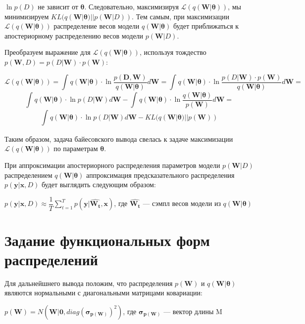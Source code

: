 \documentclass{article}
\begin{document}
$\ln{p(D)}$ не зависит от $\pmb{\theta}$. Следовательно, максимизируя $\mathcal{L}(q(\mathbf{W} | \pmb{\theta}))$, мы минимизируем $KL(q(\mathbf{W} | \pmb{\theta}) || p(\mathbf{W}| D))$. Тем самым, при максимизации $\mathcal{L}(q(\mathbf{W} | \pmb{\theta}))$ распределение весов модели $q(\mathbf{W} | \pmb{\theta})$ будет приближаться к апостериорному распределению весов модели $p(\mathbf{W}| D)$.

Преобразуем выражение для $\mathcal{L}(q(\mathbf{W} | \pmb{\theta}))$, используя тождество
$p(\mathbf{W}, D) = p(D | \mathbf{W}) \cdot p(\mathbf{W})$:

\[
\mathcal{L}(q(\mathbf{W} | \pmb{\theta})) =
\int_{}{} q(\mathbf{W} | \pmb{\theta}) \cdot \ln{\dfrac{p(\mathbf{D}, \mathbf{W})}{q(\mathbf{W} | \pmb{\theta})}} d\mathbf{W} =
\int_{}{} q(\mathbf{W} | \pmb{\theta}) \cdot \ln{\dfrac{p(D | \mathbf{W}) \cdot p(\mathbf{W})}{q(\mathbf{W} | \pmb{\theta})}} d\mathbf{W} =
\]\[
\int_{}{} q(\mathbf{W} | \pmb{\theta}) \cdot \ln{p(D | \mathbf{W})} d\mathbf{W} - \int_{}{} q(\mathbf{W} | \pmb{\theta}) \cdot \ln{\dfrac{q(\mathbf{W} | \pmb{\theta})}{p(\mathbf{W})}} d\mathbf{W} =
\]\[
\int_{}{} q(\mathbf{W} | \pmb{\theta}) \cdot \ln{p(D | \mathbf{W})} d\mathbf{W} - KL(q(\mathbf{W} | \pmb{\theta}) || p(\mathbf{W}))
\]

Таким образом, задача байесовского вывода свелась к задаче максимизации $\mathcal{L}(q(\mathbf{W} | \pmb{\theta}))$ по параметрам $\pmb{\theta}$.

При аппроксимации апостериорного распределения параметров модели $p(\mathbf{W}| D)$ распределением $q(\mathbf{W} | \pmb{\theta})$ аппроксимация предсказательного распределения $p(\mathbf{y} | \mathbf{x}, D)$ будет выглядить следующим образом:

$
p(\mathbf{y} | \mathbf{x}, D)
\approx \dfrac{1}{T} \sum_{t=1}^{T}{p(\mathbf{y} | \hat{\mathbf{W_t}}, \mathbf{x})}
$, где $\hat{\mathbf{W_t}}$ --- сэмпл весов модели из $q(\mathbf{W} | \pmb{\theta})$

\section{Задание функциональных форм распределений}
Для дальнейшнего вывода положим, что распределения $p(\mathbf{W})$ и $q(\mathbf{W} | \pmb{\theta})$ являются нормальными с диагональными матрицами ковариации:

$
p(\mathbf{W}) =
N(\mathbf{W} | \mathbf{0}, diag(\pmb{\sigma_{p(\mathbf{W})}})^{2})$,
где $\pmb{\sigma_{p(\mathbf{W})}}$ — вектор длины M
\end{document}
